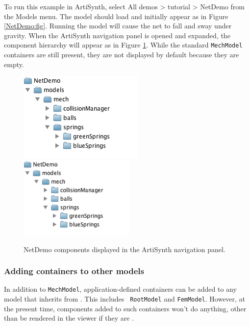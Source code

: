 To run this example in ArtiSynth, select {\sf All demos > tutorial >
NetDemo} from the {\sf Models} menu. The model should load and
initially appear as in Figure \ref{NetDemo:fig}.  Running the model
will cause the net to fall and sway under gravity. When the ArtiSynth
navigation panel is opened and expanded, the component hierarchy will
appear as in Figure \ref{NetDemoNav:fig}. While the standard
{\tt MechModel} containers are still present, they are not displayed
by default because they are empty.

\begin{figure}[ht]
\begin{center}
\iflatexml
 \includegraphics[]{images/NetDemoNav}
\else
 \includegraphics[width=2.25in]{images/NetDemoNav}
\fi
\end{center}
\caption{NetDemo components displayed in the ArtiSynth navigation panel.}
\label{NetDemoNav:fig}
\end{figure}

\subsubsection{Adding containers to other models}

In addition to {\tt MechModel}, application-defined containers can be
added to any model that inherits from
. This includes {\tt
RootModel} and {\tt FemModel}. However, at the present time,
components added to such containers won't do anything, other than be
rendered in the viewer if they are
.

